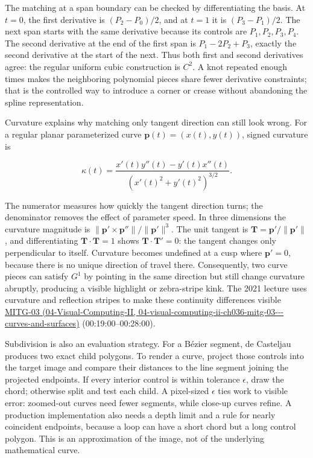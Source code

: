 The matching at a span boundary can be checked by differentiating the basis. At \(t=0\), the first derivative is \((P_2-P_0)/2\), and at \(t=1\) it is \((P_3-P_1)/2\). The next span starts with the same derivative because its controls are \(P_1,P_2,P_3,P_4\). The second derivative at the end of the first span is \(P_1-2P_2+P_3\), exactly the second derivative at the start of the next. Thus both first and second derivatives agree: the regular uniform cubic construction is \(C^2\). A knot repeated enough times makes the neighboring polynomial pieces share fewer derivative constraints; that is the controlled way to introduce a corner or crease without abandoning the spline representation.

Curvature explains why matching only tangent direction can still look wrong. For a regular planar parameterized curve \(\boldsymbol{p}(t)=(x(t),y(t))\), signed curvature is

\[
\kappa(t)=\frac{x'(t)y''(t)-y'(t)x''(t)}
{\left(x'(t)^2+y'(t)^2\right)^{3/2}}.
\]

The numerator measures how quickly the tangent direction turns; the denominator removes the effect of parameter speed. In three dimensions the curvature magnitude is \(\|\boldsymbol{p}'\times\boldsymbol{p}''\|/\|\boldsymbol{p}'\|^3\). The unit tangent is \(\boldsymbol{T}=\boldsymbol{p}'/\|\boldsymbol{p}'\|\), and differentiating \(\boldsymbol{T}\cdot\boldsymbol{T}=1\) shows \(\boldsymbol{T}\cdot\boldsymbol{T}'=0\): the tangent changes only perpendicular to itself. Curvature becomes undefined at a cusp where \(\boldsymbol{p}'=0\), because there is no unique direction of travel there. Consequently, two curve pieces can satisfy \(G^1\) by pointing in the same direction but still change curvature abruptly, producing a visible highlight or zebra-stripe kink. The 2021 lecture uses curvature and reflection stripes to make these continuity differences visible \href{../04-Visual-Computing-II/main.pdf\#nameddest=04-visual-computing-ii-ch036-mitg-03---curves-and-surfaces}{MITG-03 (04-Visual-Computing-II, 04-visual-computing-ii-ch036-mitg-03-\/-\/-curves-and-surfaces)} (00:19:00--00:28:00).

Subdivision is also an evaluation strategy. For a Bézier segment, de Casteljau produces two exact child polygons. To render a curve, project those controls into the target image and compare their distances to the line segment joining the projected endpoints. If every interior control is within tolerance \(\epsilon\), draw the chord; otherwise split and test each child. A pixel-sized \(\epsilon\) ties work to visible error: zoomed-out curves need fewer segments, while close-up curves refine. A production implementation also needs a depth limit and a rule for nearly coincident endpoints, because a loop can have a short chord but a long control polygon. This is an approximation of the image, not of the underlying mathematical curve.

